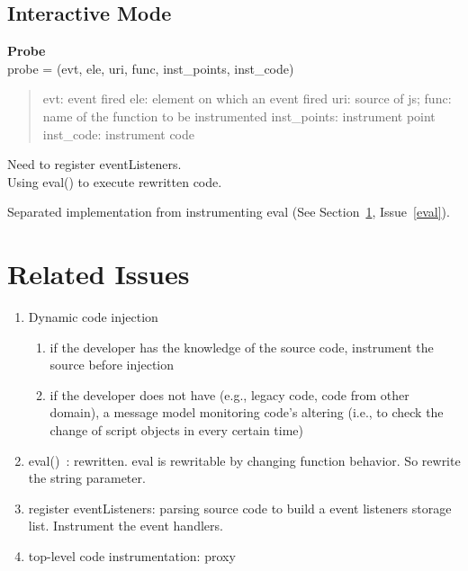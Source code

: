 \documentclass[a4paper,twocolumn,10pt]{article}
\def\denseitems{
  \itemsep1pt plus1pt minus1pt
  \parsep0pt plus0pt
  \parskip0pt\topsep0pt}
\begin{document}
\subsection{Interactive Mode}
\textbf{Probe}\\ probe = (evt, ele, uri, func, inst\_points, inst\_code)
\begin{quote}
evt: event fired
ele: element on which an event fired
uri: source of js;
func: name of the function to be instrumented
inst\_points: instrument point
inst\_code: instrument code
\end{quote}

Need to register eventListeners.\\

Using eval() to execute rewritten code. 

Separated implementation from instrumenting eval (See Section~\ref{sec_relatedIssues}, Issue~\ref{eval}).

\section{Related Issues}\label{sec_relatedIssues}
\begin{enumerate}\denseitems
    \item Dynamic code injection
        \begin{enumerate}\denseitems
            \item if the developer has the knowledge of the source code, instrument the source before injection
            \item if the developer does not have (e.g., legacy code, code from other domain), a message model monitoring code's altering (i.e., to check the change of script objects in every certain time)
        \end{enumerate}


    \item eval()~\label{eval}: rewritten. eval is rewritable by changing function behavior. So rewrite the string parameter.

    \item register eventListeners: parsing source code to build a event listeners storage list. Instrument the event handlers.

    \item top-level code instrumentation: proxy

\end{enumerate}
\end{document}
